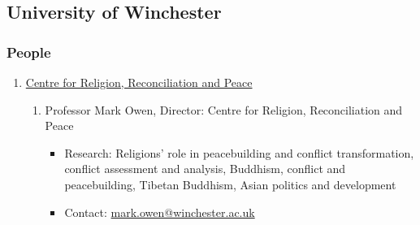 \documentclass[a4paper,10.5pt]{article}
\begin{document}
\subsection{University of Winchester}
\label{sec:orgdcee2a9}
\subsubsection{People}
\label{sec:orgbad7195}
\begin{enumerate}
\item \href{https://www.winchester.ac.uk/research/our-impactful-research/research-in-humanities-and-social-sciences/research-centres-and-networks/centre-for-religion-reconciliation-and-peace/}{Centre for Religion, Reconciliation and Peace}
\label{sec:org5a8e60e}
\begin{enumerate}
\item Professor Mark Owen, Director: Centre for Religion, Reconciliation and Peace
\label{sec:org41fe155}
\begin{itemize}
\item Research: Religions' role in peacebuilding and conflict transformation, conflict assessment and analysis, Buddhism, conflict and peacebuilding, Tibetan Buddhism, Asian politics and development\\
\item Contact: \href{mailto:mark.owen@winchester.ac.uk}{mark.owen@winchester.ac.uk}\\
\end{itemize}
\end{enumerate}
\end{enumerate}
\end{document}
